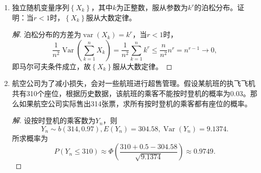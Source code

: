 \documentclass[12pt]{article}
\newcommand{\hei}{\CJKfamily{hei}}                          %
\begin{document}
\begin{enumerate}


\item {\hei 独立随机变量序列$ \left\{ {{X}_{k}} \right\} $，其中$ k $为正整数，服从参数为$ {{k}^{r}} $的泊松分布。证明：当$ r < 1 $时，$ \left\{ {{X}_{k}} \right\} $服从大数定律。}
\begin{proof}[解]
	泊松分布的方差为$ \operatorname{var}\left( {{X}_{k}} \right)={{k}^{r}} $，当$ r < 1 $时，
	\begin{equation}
		\frac{1}{{{n}^{2}}}\operatorname{Var}\left( \sum\limits_{k=1}^{n}{{{X}_{k}}} \right)=\frac{1}{{{n}^{2}}}\sum\limits_{k=1}^{n}{{{k}^{r}}}\le \frac{n}{{{n}^{2}}}{{n}^{r}}={{n}^{r-1}} \longrightarrow 0,
	\end{equation}
	即马尔可夫条件成立，故$ \left\{ {{X}_{k}} \right\} $服从大数定律。
\end{proof}


\item {\hei 航空公司为了减小损失，会对一些航班进行超售管理。假设某航班的执飞飞机共有310个座位，根据历史数据，该航班的乘客不能按时登机的概率为0.03。那么如果航空公司实际售出314张票，求所有按时登机的乘客都有座位的概率。}
\begin{proof}[解]
	设按时登机的乘客数为$ Y_n $，则
	\begin{equation}
		Y_n \sim b(314,0.97), E(Y_n ) = 304.58, \operatorname{Var}\left( {{Y}_{n}} \right) = 9.1374 .
	\end{equation}
	所求概率为
	\begin{equation}
		P\left( {{Y}_{n}}\le 310 \right)\approx \Phi \left( \frac{310+0.5-304.58}{\sqrt{9.1374}} \right)\approx 0.9749 .
	\end{equation}
\end{proof}



\end{enumerate}
\end{document}

